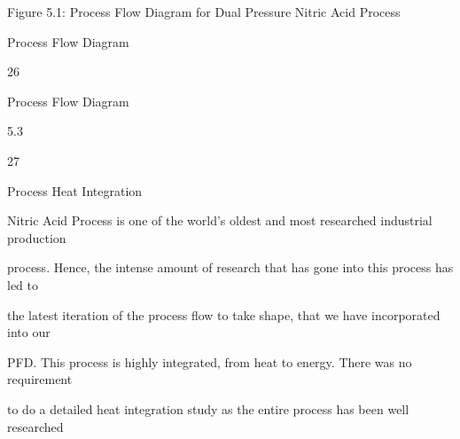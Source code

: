 \documentclass[a4paper,portrait,12pt]{article}
\begin{document}
\begin{flushleft}
\newpage
Figure 5.1: Process Flow Diagram for Dual Pressure Nitric Acid Process
\end{flushleft}





\begin{flushleft}
Process Flow Diagram
\end{flushleft}


26





\begin{flushleft}
\newpage
Process Flow Diagram
\end{flushleft}





5.3





27





\begin{flushleft}
Process Heat Integration
\end{flushleft}





\begin{flushleft}
Nitric Acid Process is one of the world's oldest and most researched industrial production
\end{flushleft}


\begin{flushleft}
process. Hence, the intense amount of research that has gone into this process has led to
\end{flushleft}


\begin{flushleft}
the latest iteration of the process flow to take shape, that we have incorporated into our
\end{flushleft}


\begin{flushleft}
PFD. This process is highly integrated, from heat to energy. There was no requirement
\end{flushleft}


\begin{flushleft}
to do a detailed heat integration study as the entire process has been well researched
\end{flushleft}
\end{document}
